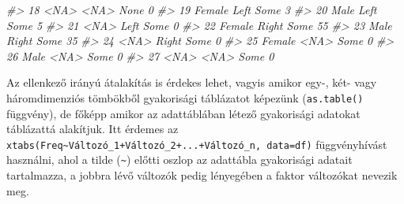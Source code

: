 \documentclass[
]{book}
\newenvironment{Shaded}{\begin{snugshade}}{\end{snugshade}}
\newcommand{\CommentTok}[1]{\textcolor[rgb]{0.56,0.35,0.01}{\textit{#1}}}
\begin{document}
\begin{Shaded}
\begin{Highlighting}[]
\CommentTok{\#\textgreater{} 18   \textless{}NA\textgreater{}  \textless{}NA\textgreater{} None    0}
\CommentTok{\#\textgreater{} 19 Female  Left Some    3}
\CommentTok{\#\textgreater{} 20   Male  Left Some    5}
\CommentTok{\#\textgreater{} 21   \textless{}NA\textgreater{}  Left Some    0}
\CommentTok{\#\textgreater{} 22 Female Right Some   55}
\CommentTok{\#\textgreater{} 23   Male Right Some   35}
\CommentTok{\#\textgreater{} 24   \textless{}NA\textgreater{} Right Some    0}
\CommentTok{\#\textgreater{} 25 Female  \textless{}NA\textgreater{} Some    0}
\CommentTok{\#\textgreater{} 26   Male  \textless{}NA\textgreater{} Some    0}
\CommentTok{\#\textgreater{} 27   \textless{}NA\textgreater{}  \textless{}NA\textgreater{} Some    0}
\end{Highlighting}
\end{Shaded}

Az ellenkező irányú átalakítás is érdekes lehet, vagyis amikor egy-, két- vagy háromdimenziós tömbökből gyakorisági táblázatot képezünk (\texttt{as.table()} függvény), de főképp amikor az adattáblában létező gyakorisági adatokat táblázattá alakítjuk. Itt érdemes az \texttt{xtabs(Freq\textasciitilde{}Változó\_1+Változó\_2+...+Változó\_n,\ data=df)} függvényhívást használni, ahol a tilde (\texttt{\textasciitilde{}}) előtti oszlop az adattábla gyakorisági adatait tartalmazza, a jobbra lévő változók pedig lényegében a faktor változókat nevezik meg.
\end{document}
